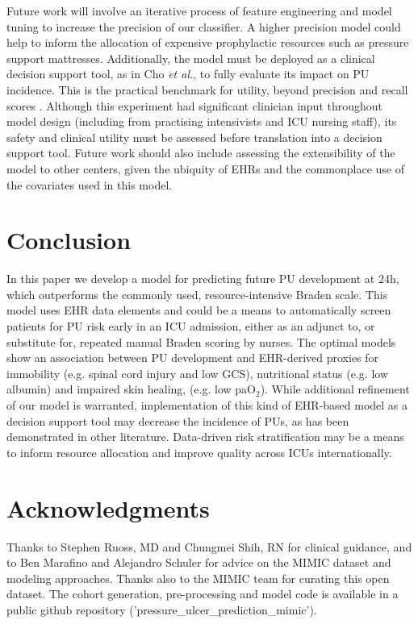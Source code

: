 \documentclass{ws-procs11x85}
\begin{document}
\noindent 
Future work will involve an iterative process of feature engineering and model tuning to increase the precision of our classifier. A higher precision model could help to inform the allocation of expensive prophylactic resources such as pressure support mattresses. Additionally, the model must be deployed as a clinical decision support tool, as in Cho \emph{et al.}, to fully evaluate its impact on PU incidence. This is the practical benchmark for utility, beyond precision and recall scores \cite{cho}. Although this experiment had significant clinician input throughout model design (including from practising intensivists and ICU nursing staff), its safety and clinical utility must be assessed before translation into a decision support tool. Future work should also include assessing the extensibility of the model to other centers, given the ubiquity of EHRs and the commonplace use of the covariates used in this model.
\\

\section{Conclusion}
In this paper we develop a model for predicting future PU development at 24h, which outperforms the commonly used, resource-intensive Braden scale. This model uses EHR data elements and could be a means to automatically screen patients for PU risk early in an ICU admission, either as an adjunct to, or substitute for, repeated manual Braden scoring by nurses. The optimal models show an association between PU development and EHR-derived proxies for immobility (e.g. spinal cord injury and low GCS), nutritional status (e.g. low albumin) and impaired skin healing, (e.g. low paO$_2$). While additional refinement of our model is warranted, implementation of this kind of EHR-based model as a decision support tool may decrease the incidence of PUs, as has been demonstrated in other literature. Data-driven risk stratification may be a means to inform resource allocation and improve quality across ICUs internationally.

\section{Acknowledgments}
Thanks to Stephen Ruoss, MD and Chungmei Shih, RN for clinical guidance, and to Ben Marafino and Alejandro Schuler for advice on the MIMIC dataset and modeling approaches. Thanks also to the MIMIC team for curating this open dataset. The cohort generation, pre-processing and model code is available in a public github repository ('pressure\_ulcer\_prediction\_mimic').
\small 


\end{document}

